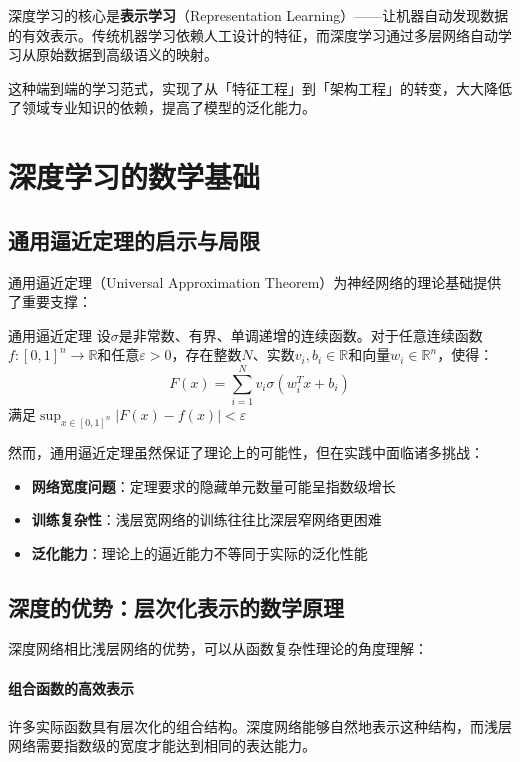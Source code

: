 深度学习的核心是\textbf{表示学习}（Representation Learning）——让机器自动发现数据的有效表示。传统机器学习依赖人工设计的特征，而深度学习通过多层网络自动学习从原始数据到高级语义的映射。

这种端到端的学习范式，实现了从「特征工程」到「架构工程」的转变，大大降低了领域专业知识的依赖，提高了模型的泛化能力。

\section{深度学习的数学基础}

\subsection{通用逼近定理的启示与局限}

通用逼近定理（Universal Approximation Theorem）为神经网络的理论基础提供了重要支撑：

\begin{theorem}[]{通用逼近定理}
设$\sigma$是非常数、有界、单调递增的连续函数。对于任意连续函数$f: [0,1]^n \rightarrow \mathbb{R}$和任意$\varepsilon > 0$，存在整数$N$、实数$v_i, b_i \in \mathbb{R}$和向量$w_i \in \mathbb{R}^n$，使得：
$$F(x) = \sum_{i=1}^{N} v_i \sigma(w_i^T x + b_i)$$
满足$\sup_{x \in [0,1]^n} |F(x) - f(x)| < \varepsilon$
\end{theorem}

然而，通用逼近定理虽然保证了理论上的可能性，但在实践中面临诸多挑战：

\begin{itemize}
\item \textbf{网络宽度问题}：定理要求的隐藏单元数量可能呈指数级增长
\item \textbf{训练复杂性}：浅层宽网络的训练往往比深层窄网络更困难
\item \textbf{泛化能力}：理论上的逼近能力不等同于实际的泛化性能
\end{itemize}

\subsection{深度的优势：层次化表示的数学原理}

深度网络相比浅层网络的优势，可以从函数复杂性理论的角度理解：

\paragraph{组合函数的高效表示}
许多实际函数具有层次化的组合结构。深度网络能够自然地表示这种结构，而浅层网络需要指数级的宽度才能达到相同的表达能力。

